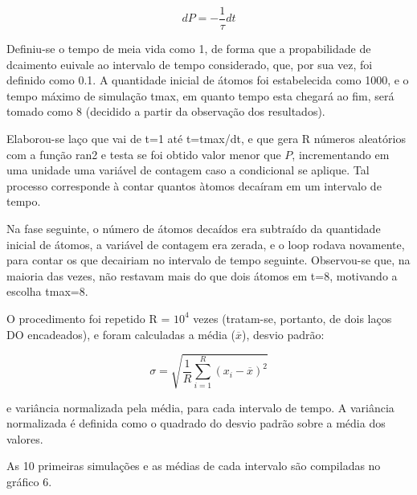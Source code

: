 \message{ !name(relatorio.tex)}\documentclass{article}
\begin{document}
\begin{equation}
  \label{eq:prob}
  dP=-\frac{1}{\tau}dt
\end{equation}

Definiu-se o tempo de meia vida como 1, de forma que a propabilidade de dcaimento euivale ao intervalo de tempo considerado, que, por sua vez, foi definido como 0.1. A quantidade inicial de átomos foi estabelecida como 1000, e o tempo máximo de simulação tmax, em quanto tempo esta chegará ao fim, será tomado como 8 (decidido a partir da observação dos resultados).\par
Elaborou-se laço que vai de t=1 até t=tmax/dt, e que gera R números aleatórios com a função ran2 e testa se foi obtido valor menor que $P$, incrementando em uma unidade uma variável de contagem caso a condicional se aplique. Tal processo corresponde à contar quantos àtomos decaíram em um intervalo de tempo.\par
Na fase seguinte, o número de átomos decaídos era subtraído da quantidade inicial de átomos, a variável de contagem era zerada, e o loop rodava novamente, para contar os que decairiam no intervalo de tempo seguinte. Observou-se que, na maioria das vezes, não restavam mais do que dois átomos em t=8, motivando a escolha tmax=8.\par
O procedimento foi repetido R = $10^4$ vezes (tratam-se, portanto, de dois laços DO encadeados), e foram calculadas a média ($\overline{x}$), desvio padrão:

\[\sigma =\sqrt{ \frac{1}{R} \sum_{i=1}^R (x_i - \overline{x})^2}\]

 e variância normalizada pela média, para cada intervalo de tempo. A variância normalizada é definida como o quadrado do desvio padrão sobre a média dos valores.\par
As 10 primeiras simulações e as médias de cada intervalo são compiladas no gráfico 6.
\end{document}

